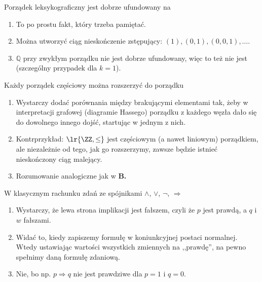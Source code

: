 \begin{solutions}
    \sol Porządek leksykograficzny jest dobrze ufundowany na

    \begin{enumerate}[\bf A.]
        \item To po prostu fakt, który trzeba pamiętać.

        \item Można utworzyć ciąg nieskończenie zstępujący: $(1), (0, 1), (0, 0, 1), \ldots$.

        \item $\mathbb{Q}$ przy zwykłym porządku nie jest dobrze ufundowany, więc to też nie jest (szczególny przypadek dla $k = 1$).
    \end{enumerate}

    \sol Każdy porządek częściowy można rozszerzyć do porządku
    
    \begin{enumerate}[\bf A.]
        \item Wystarczy dodać porównania między brakującymi elementami tak, żeby w interpretacji grafowej (diagramie Hassego) porządku z każdego węzła dało się do dowolnego innego dojść, startując w jednym z nich.
        \item Kontrprzykład: $\lr{\ZZ, \leq}$ jest częściowym (a nawet liniowym) porządkiem, ale niezależnie od tego, jak go rozszerzymy, zawsze będzie istnieć nieskończony ciąg malejący.
        \item Rozumowanie analogiczne jak w \textbf{B.}
    \end{enumerate}

    \sol W klasycznym rachunku zdań ze spójnikami $\land$, $\lor$, $\neg$, $\Rightarrow$

    \begin{enumerate}[\bf A.]
        \item Wystarczy, że lewa strona implikacji jest fałszem, czyli że $p$ jest prawdą, a $q$ i $w$ fałszami.

        \item Widać to, kiedy zapiszemy formułę w koniunkcyjnej postaci normalnej. Wtedy ustawiając wartości wszystkich zmiennych na ,,prawdę'', na pewno spełnimy daną formułę zdaniową.

        \item Nie, bo np. $p \Rightarrow q$ nie jest prawdziwe dla $p=1$ i $q=0$.
    \end{enumerate}
\end{solutions}
